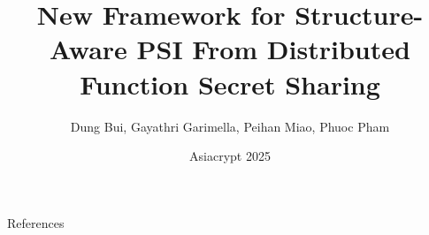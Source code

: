 \documentclass[10pt, aspectratio=169]{beamer}
\title{New Framework for Structure-Aware PSI From Distributed Function Secret Sharing}
\author{Dung Bui, Gayathri Garimella, Peihan Miao, {\color{brown} Phuoc Pham}}
\date{Asiacrypt 2025}
\begin{document}
\begin{frame}
  \titlepage
\end{frame}











\begin{frame}{References}
  \footnotesize{
    
    
  }
\end{frame}
\end{document}
